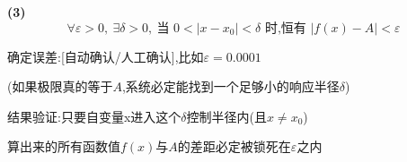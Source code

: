 \documentclass[11pt,a4paper,UTF8]{ctexart}
\begin{document}
\textbf{(3)} 
\begin{equation*}
\forall \varepsilon > 0, \ \exists \delta > 0, \ \text{当 } 0 < \vert{}x - x_0\vert{} < \delta \text{ 时,恒有 } \vert{}f(x) - A\vert{} < \varepsilon
\end{equation*}



\begin{solbox}[{分步推导与答题规范}]
确定误差:[自动确认/人工确认],比如$\varepsilon = 0.0001$

(如果极限真的等于$A$,系统必定能找到一个足够小的响应半径$\delta$)

结果验证:只要自变量x进入这个$\delta$控制半径内(且$x \neq x_0$)

  算出来的所有函数值$f(x)$与$A$的差距必定被锁死在$\varepsilon$之内
\end{solbox}
\end{document}
